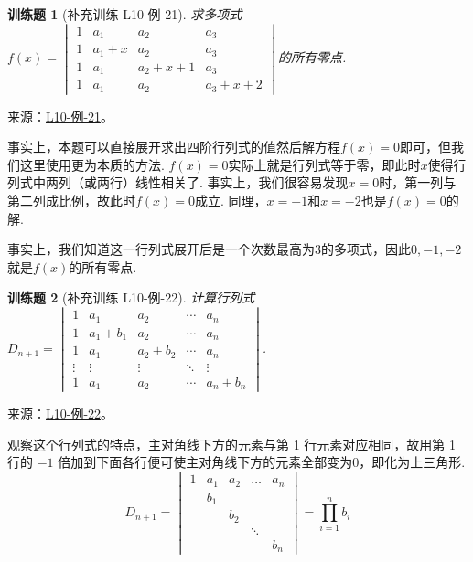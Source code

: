 \documentclass[UTF8,12pt,a4paper,fontset=fandol]{ctexart}
\newtheorem{exercise}{训练题}[section]
\begin{document}
\begin{exercise}[补充训练 L10-例-21]\label{prob:L10-例-21}
求多项式$f(x)=\begin{vmatrix}
            1 & a_1   & a_2     & a_3     \\
            1 & a_1+x & a_2     & a_3     \\
            1 & a_1   & a_2+x+1 & a_3     \\
            1 & a_1   & a_2     & a_3+x+2
        \end{vmatrix}$的所有零点.
\end{exercise}
\noindent 来源：\href{https://github.com/yhwu-is/Linear-Algebra-Left-Undone/blob/new/%E8%AE%B2%E4%B9%89/%E4%B8%93%E9%A2%98/10%20%E8%A1%8C%E5%88%97%E5%BC%8F.tex}{L10-例-21}。
\begin{solve}
事实上，本题可以直接展开求出四阶行列式的值然后解方程$f(x)=0$即可，但我们这里使用更为本质的方法. $f(x)=0$实际上就是行列式等于零，即此时$x$使得行列式中两列（或两行）线性相关了. 事实上，我们很容易发现$x=0$时，第一列与第二列成比例，故此时$f(x)=0$成立. 同理，$x=-1$和$x=-2$也是$f(x)=0$的解.

    事实上，我们知道这一行列式展开后是一个次数最高为3的多项式，因此$0,-1,-2$就是$f(x)$的所有零点.
\end{solve}

\begin{exercise}[补充训练 L10-例-22]\label{prob:L10-例-22}
计算行列式$D_{n+1}=\begin{vmatrix}
            1      & a_{1}       & a_{2}       & \cdots & a_n       \\
            1      & a_{1}+b_{1} & a_{2}       & \cdots & a_n       \\
            1      & a_{1}       & a_{2}+b_{2} & \cdots & a_n       \\
            \vdots & \vdots      & \vdots      & \ddots & \vdots    \\
            1      & a_{1}       & a_{2}       & \cdots & a_n+b_{n}
        \end{vmatrix}$.
\end{exercise}
\noindent 来源：\href{https://github.com/yhwu-is/Linear-Algebra-Left-Undone/blob/new/%E8%AE%B2%E4%B9%89/%E4%B8%93%E9%A2%98/10%20%E8%A1%8C%E5%88%97%E5%BC%8F.tex}{L10-例-22}。
\begin{solve}
观察这个行列式的特点，主对角线下方的元素与第 1 行元素对应相同，故用第 1 行的 $-1$ 倍加到下面各行便可使主对角线下方的元素全部变为0，即化为上三角形.
    \[ D_{n+1}=\begin{vmatrix}
            1 & a_{1} & a_{2} & \ldots & a_n   \\
              & b_{1} &       &        &       \\
              &       & b_{2} &        &       \\
              &       &       & \ddots &       \\
              &       &       &        & b_{n}
        \end{vmatrix}=\prod_{i=1}^n b_i \]
\end{solve}
\end{document}
